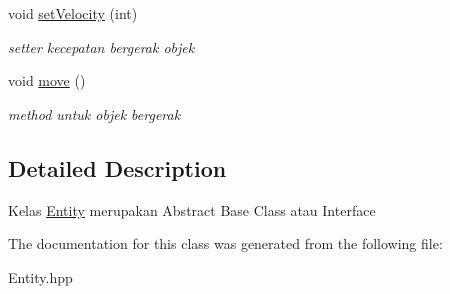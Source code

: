 \begin{DoxyCompactItemize}
\mbox{\label{classEntity_ab91bc74ca735bc2172d4eac1ed79ed2a}} 
void \hyperlink{classEntity_ab91bc74ca735bc2172d4eac1ed79ed2a}{set\+Velocity} (int)
\begin{DoxyCompactList}\small\item\em setter kecepatan bergerak objek \end{DoxyCompactList}\item 
\mbox{\label{classEntity_ac1f12a5f7922624ee7ced15be3b884de}} 
void \hyperlink{classEntity_ac1f12a5f7922624ee7ced15be3b884de}{move} ()
\begin{DoxyCompactList}\small\item\em method untuk objek bergerak \end{DoxyCompactList}\end{DoxyCompactItemize}


\subsection{Detailed Description}
Kelas \hyperlink{classEntity}{Entity} merupakan Abstract Base Class atau Interface 

The documentation for this class was generated from the following file\+:\begin{DoxyCompactItemize}
\item 
Entity.\+hpp\end{DoxyCompactItemize}
